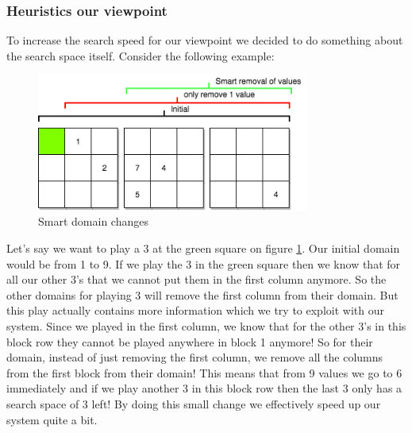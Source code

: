 \documentclass{report}
\begin{document}
\subsubsection{Heuristics our viewpoint}
To increase the search speed for our viewpoint we decided to do something about the search space itself. Consider the following example:
\begin{figure}[h!]
\centering
\includegraphics[width=0.8\textwidth]{smartremoval}
\caption{Smart domain changes}
\label{fig:smart_domain}
\end{figure}
Let's say we want to play a 3 at the green square on figure \ref{fig:smart_domain}. Our initial domain would be from 1 to 9. If we play the 3 in the green square then we know that for all our other 3's that we cannot put them in the first column anymore. So the other domains for playing 3 will remove the first column from their domain. But this play actually contains more information which we try to exploit with our system. Since we played in the first column, we know that for the other 3's in this block row they cannot be played anywhere in block 1 anymore! So for their domain, instead of just removing the first column, we remove all the columns from the first block from their domain! This means that from 9 values we go to 6 immediately and if we play another 3 in this block row then the last 3 only has a search space of 3 left! By doing this small change we effectively speed up our system quite a bit.
\end{document}
